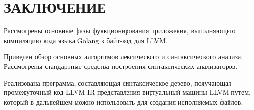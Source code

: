 \section*{ЗАКЛЮЧЕНИЕ}\label{sec:conclusion}

Рассмотрены основные фазы функционирования приложения, выполняющего компиляцию кода языка Golang в байт-код для LLVM.

Приведен обзор основных алгоритмов лексического и синтаксического анализа.
Рассмотрены стандартные средства построения синтаксических анализаторов.

Реализована программа, составляющая синтаксическое дерево,
получающая промежуточный код LLVM IR представления виртуальный машины LLVM путем, который в дальнейшем можно использовать для
создания исполняемых файлов.